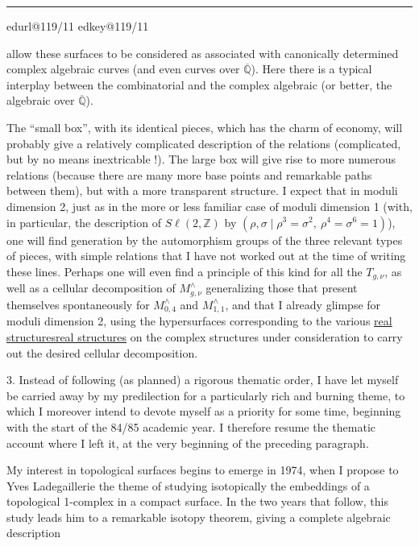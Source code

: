 \documentclass[11pt,a4paper]{article}
\makeatletter
\newif\ifreading
\newif\ifenglish
\def\CurrentScanURL{}
\def\CurrentPageKey{}
\def\CurrentApparatus{}
\newcommand{\scanpage}[1]{%
  \clearpage
  \expandafter\let\expandafter\CurrentScanURL\csname edurl@#1\endcsname
  \expandafter\let\expandafter\CurrentPageKey\csname edkey@#1\endcsname
  \def\CurrentApparatus{}%
  \hypertarget{scan-\CurrentPageKey}{}%
  \typeout{EDITION-SCAN: \CurrentPageKey; PDFPAGE: \the\numexpr\ReadonlyShipoutCounter+1\relax}%
  \ifreading
    \marginnote{\raggedright\scriptsize\sffamily\href{\CurrentScanURL}{119 / \csname edpage@#1\endcsname}}%
  \else
    \noindent{\small\sffamily\href{\CurrentScanURL}{[scan #1]}}\par\smallskip
  \fi}
\newcommand{\mspage}[1]{%
  \ifreading\marginnote{\raggedright\scriptsize\sffamily p.\,#1}[2\baselineskip]%
  \else\noindent{\small\sffamily[p.\,#1]}\par\smallskip\fi}
\let\TextUline\uline
\renewcommand{\uline}[1]{\ifmmode\underline{#1}\else\TextUline{#1}\fi}
\newcommand{\margin}[1]{%
  \sbox{\MarginalTestBox}{\parbox{\marginparwidth}{\raggedright\footnotesize#1}}%
  \ifdim\dimexpr\ht\MarginalTestBox+\dp\MarginalTestBox\relax>3\baselineskip
    \par\smallskip\noindent\begin{minipage}{\linewidth}\hrule\smallskip
    {\footnotesize\textcolor{HandInk}{\ifenglish Marginal note:\else Note marginale :\fi\ #1}}\smallskip\hrule\end{minipage}\par\smallskip
  \else
    \marginnote{\raggedright\footnotesize\textcolor{HandInk}{#1}}%
  \fi}
\newcommand{\finishscan}{\ifx\CurrentApparatus\empty\else\par\bigskip\noindent\rule{.35\linewidth}{.35pt}\par\smallskip{\footnotesize\setlength{\parskip}{3pt}\CurrentApparatus}\fi}
\makeatother
\begin{document}
\margin{10}

\finishscan
\scanpage{119/11}
\mspage{9}

allow these surfaces to be considered as associated with
canonically determined complex algebraic curves (and even curves over $\overline{\mathbb{Q}}$).
Here there is a typical interplay between the combinatorial
and the complex algebraic (or better, the algebraic over $\overline{\mathbb{Q}}$).

The ``small box'', with its identical pieces, which has
the charm of economy, will probably give a relatively
complicated description of the relations (complicated, but by no means
inextricable !). The large box will give rise to more numerous
relations (because there are many more base points and
remarkable paths between them), but with a more transparent structure. I
expect that in moduli dimension 2, just as in the more or
less familiar case of moduli dimension 1 (with, in particular, the
description of $S\ell(2,\mathbb{Z})$ by $(\rho,\sigma \mid \rho^3 = \sigma^2,\ \rho^4 = \sigma^6 = 1)$), one will find
generation by the automorphism groups of the three relevant types
of pieces, with simple relations that I have not worked out
at the time of writing these lines. Perhaps one will even find a
principle of this kind for all the $T_{g,\nu}$, as well as a cellular
decomposition of $M^{\wedge}_{g,\nu}$ generalizing those that present themselves spontaneously
for $M^{\wedge}_{0,4}$ and $M^{\wedge}_{1,1}$, and that I already glimpse for
moduli dimension 2, using the hypersurfaces corresponding
to the various \uline{real structures} on the complex structures
under consideration to carry out the desired cellular decomposition.


3. Instead of following (as planned) a rigorous thematic
order, I have let myself be carried away by my predilection for a
particularly rich and burning theme, to which I moreover intend to
devote myself as a priority for some time, beginning with the start
of the 84/85 academic year. I therefore resume the thematic account where I left it,
at the very beginning of the preceding paragraph.

My interest in topological surfaces begins to emerge
in 1974, when I propose to Yves Ladegaillerie the theme of studying
isotopically the embeddings of a topological 1-complex in a compact
surface. In the two years that follow, this study leads him to
a remarkable isotopy theorem, giving a complete algebraic description
\end{document}
